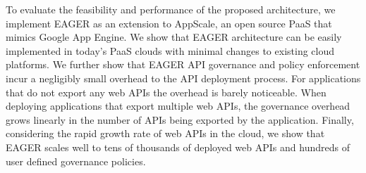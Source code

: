 To evaluate the feasibility and performance of the proposed architecture, we implement EAGER as an extension to AppScale, an open source
PaaS that mimics Google App Engine. We show that EAGER architecture can be easily implemented in today's PaaS clouds with
minimal changes to existing cloud platforms. We further show that EAGER API governance and policy enforcement incur a negligibly small 
overhead to the API deployment process. For applications that do not export any web APIs the overhead is barely noticeable. 
When deploying applications that export multiple web APIs, the governance overhead grows linearly in the number of APIs being exported 
by the application. Finally, considering the rapid growth rate of web APIs in the cloud, we show that EAGER scales well to tens of thousands of
deployed web APIs and hundreds of user defined governance policies.


